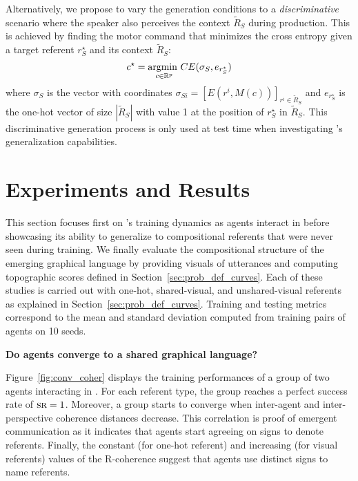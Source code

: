Alternatively, we propose to vary the generation conditions to a \textit{discriminative} scenario where the speaker also perceives the context $\tilde{R}_S$ during production. This is achieved by finding the motor command that minimizes the cross entropy given a target referent $r^\star_S$ and its context $\tilde{R}_S$:
\begin{equation}
    c^\star = \underset{c\in \mathbb{R} ^p}{\textrm{argmin }} CE( \sigma_S, e_{r^\star_S})
    \label{eq:discri_gen}
\end{equation}
%
where $\sigma_S$ is the vector with coordinates $\sigma_{Si} = [E(r^i, M(c))]_{r^i\in \tilde{R}_S}$ and $e_{r^\star_S}$ is the one-hot vector of size $|\tilde{R}_S|$ with value 1 at the position of $r^\star_S$ in $\tilde{R}_S$. This discriminative generation process is only used at test time when investigating \curves's generalization capabilities. 
%

\section{Experiments and Results}

This section focuses first on \curves's training dynamics as agents interact in \greg before showcasing its ability to generalize to compositional referents that were never seen during training. We finally evaluate the compositional structure of the emerging graphical language by providing visuals of utterances and computing topographic scores defined in Section~\ref{sec:prob_def_curves}. Each of these studies is carried out with one-hot, shared-visual, and unshared-visual referents as explained in Section~\ref{sec:prob_def_curves}. Training and testing metrics correspond to the mean and standard deviation computed from training pairs of agents on 10 seeds. 

\textbf{Do agents converge to a shared graphical language? } 

Figure~\ref{fig:conv_coher} displays the training performances of a group of two agents interacting in \greg. For each referent type, the group reaches a perfect success rate of $\textsc{sr}=1$. Moreover, a group starts to converge when inter-agent and inter-perspective coherence distances decrease. This correlation is proof of emergent communication as it indicates that agents start agreeing on signs to denote referents. Finally, the constant (for one-hot referent) and increasing (for visual referents) values of the R-coherence suggest that agents use distinct signs to name referents.

